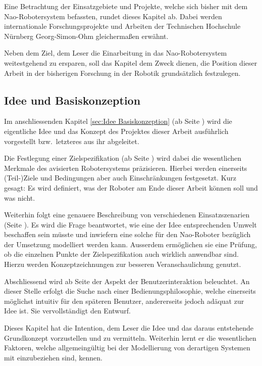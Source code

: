 \documentclass[fontsize=11pt,paper=a4,twoside,openright]{scrreprt}
\begin{document}
Eine Betrachtung der Einsatzgebiete und Projekte, welche sich bisher mit dem Nao-Robotersystem befassten, rundet dieses Kapitel ab.
Dabei werden internationale Forschungsprojekte und Arbeiten der Technischen Hochschule Nürnberg Georg-Simon-Ohm gleichermaßen erwähnt.

Neben dem Ziel, dem Leser die Einarbeitung in das Nao-Robotersystem weitestgehend zu ersparen, soll das Kapitel dem Zweck dienen, die Position dieser Arbeit in der bisherigen Forschung in der Robotik grundsätzlich festzulegen.

\subsection{Idee und Basiskonzeption}
\label{sssec:Basiskonzeption Idee}

Im anschliessenden Kapitel \ref{sec:Idee Basiskonzeption} (ab Seite \pageref{sec:Idee Basiskonzeption}) wird die eigentliche Idee und das Konzept des Projektes dieser Arbeit ausführlich vorgestellt bzw.\ letzteres aus ihr abgeleitet.

Die Festlegung einer Zielspezifikation (ab Seite \pageref{ssec:Zielspezifikation}) wird dabei die wesentlichen Merkmale des avisierten Robotersystems präzisieren.
Hierbei werden einerseits (Teil-)Ziele und Bedingungen aber auch Einschränkungen festgesetzt.
Kurz gesagt: Es wird definiert, was der Roboter am Ende dieser Arbeit können soll und was nicht.

Weiterhin folgt eine genauere Beschreibung von verschiedenen Einsatzszenarien (Seite \pageref{ssec:Einsatzszenarien}).
Es wird die Frage beantwortet, wie eine der Idee entsprechenden Umwelt beschaffen sein müsste und inwiefern eine solche für den Nao-Roboter bezüglich der Umsetzung modelliert werden kann.
Ausserdem ermöglichen sie eine Prüfung, ob die einzelnen Punkte der Zielspezifikation auch wirklich anwendbar sind.
Hierzu werden Konzeptzeichnungen zur besseren Veranschaulichung genutzt.

Abschliessend wird ab Seite \pageref{ssec:Bedienungsphilosophie} der Aspekt der Benutzerinteraktion beleuchtet.
An dieser Stelle erfolgt die Suche nach einer Bedienungsphilosophie, welche einerseits möglichst intuitiv für den späteren Benutzer, andererseits jedoch adäquat zur Idee ist.
Sie vervollständigt den Entwurf.

Dieses Kapitel hat die Intention, dem Leser die Idee und das daraus entstehende Grundkonzept vorzustellen und zu vermitteln.
Weiterhin lernt er die wesentlichen Faktoren, welche allgemeingültig bei der Modellierung von derartigen Systemen mit einzubeziehen sind, kennen.
\end{document}
